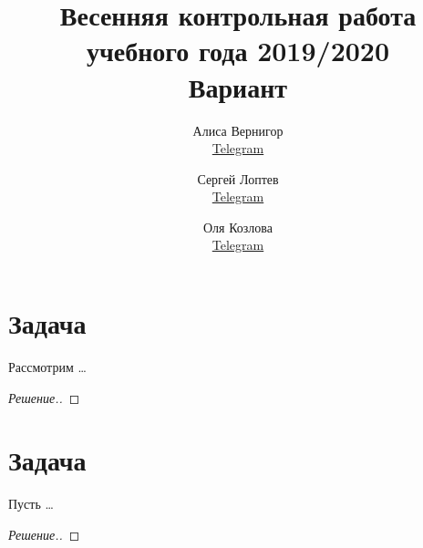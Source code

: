 \documentclass[a4paper]{article}
\title{Весенняя контрольная работа учебного года 2019/2020\\Вариант \textnumero 1}
\author{	
  Алиса Вернигор       \\ \href{https://t.me/allisyonok}{Telegram} \and
	Сергей Лоптев        \\ \href{https://t.me/beast_sl}{Telegram} \and
	Оля Козлова        \\ \href{https://t.me/grenlayk}{Telegram}
}
\date{}
\theoremstyle{remark}
\begin{document}
	\maketitle
    \section*{Задача }
        Рассмотрим \dots
        \begin{proof}[Решение.]
                
        \end{proof}	 
    
    \section*{Задача }
        Пусть \dots
        \begin{proof}[Решение.]

        \end{proof}
    
\end{document}
